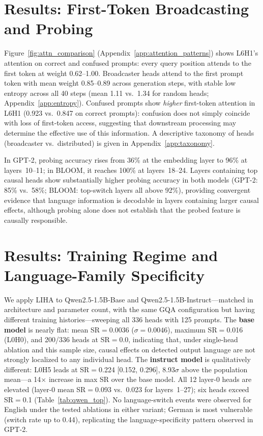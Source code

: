 \documentclass[11pt]{article}
\begin{document}
\section{Results: First-Token Broadcasting and Probing}
\label{sec:attention}

Figure~\ref{fig:attn_comparison} (Appendix~\ref{app:attention_patterns}) shows
L6H1's attention on correct and confused prompts: every query position
attends to the first token at weight 0.62--1.00. Broadcaster heads
attend to the first prompt token with mean weight 0.85--0.89 across
generation steps, with stable low entropy across all 40 steps (mean 1.11
vs.\ 1.34 for random heads; Appendix~\ref{app:entropy}). Confused
prompts show \emph{higher} first-token attention in L6H1 (0.923 vs.\
0.847 on correct prompts): confusion does not simply coincide with loss of first-token access,
suggesting that downstream processing may determine the effective use of this
information. A descriptive taxonomy of heads (broadcaster vs.\ distributed) is given in
Appendix~\ref{app:taxonomy}.

\label{sec:probing}
In GPT-2, probing accuracy rises from 36\% at the embedding layer to
96\% at layers~10--11; in BLOOM, it reaches 100\% at layers~18--24.
Layers containing top causal heads show substantially higher probing
accuracy in both models (GPT-2: 85\% vs.\ 58\%; BLOOM: top-switch
layers all above 92\%), providing convergent evidence that language information is decodable in
layers containing larger causal effects, although probing alone does not
establish that the probed feature is causally responsible.

\section{Results: Training Regime and Language-Family Specificity}
\label{sec:qwen}

We apply LIHA to Qwen2.5-1.5B-Base and Qwen2.5-1.5B-Instruct---matched
in architecture and parameter count, with the same GQA configuration but
having different training histories---sweeping all 336 heads with 125 prompts. The \textbf{base model} is nearly flat: mean SR$=$0.0036
($\sigma{=}0.0046$), maximum SR$=$0.016 (L0H0), and 200/336 heads at
SR$=$0.0, indicating that, under single-head ablation and this sample size, causal
effects on detected output language are not strongly localized to any
individual head. The \textbf{instruct model} is qualitatively
different: L0H5 leads at SR$=$0.224 [0.152, 0.296], 8.93$\sigma$ above
the population mean---a 14$\times$ increase in max SR over the base
model. All 12 layer-0 heads are elevated (layer-0 mean SR$=$0.093 vs.\
0.023 for layers~1--27); six heads exceed SR$=$0.1
(Table~\ref{tab:qwen_top}). No language-switch events were observed for English under the tested
ablations in either variant; German
is most vulnerable (switch rate up to 0.44), replicating the
language-specificity pattern observed in GPT-2.
\end{document}
